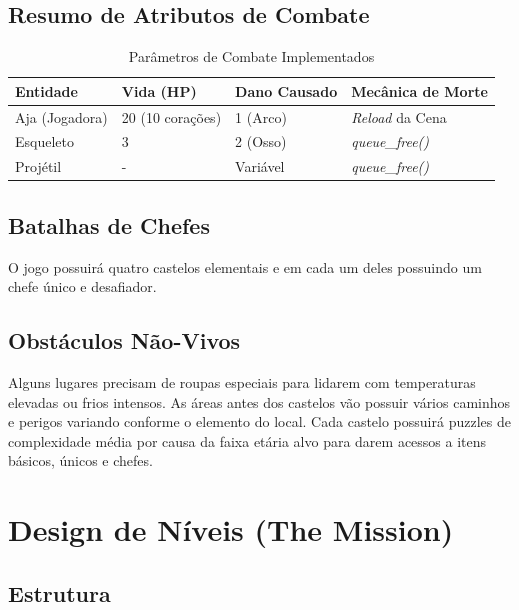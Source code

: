 \documentclass[12pt, a4paper]{article} %
\begin{document}
	\subsection{Resumo de Atributos de Combate}
	\begin{table}[H]
		\centering
		\caption{Parâmetros de Combate Implementados}
		\vspace{0.2cm}
		\begin{tabular}{@{}llll@{}}
			\toprule
			\textbf{Entidade} & \textbf{Vida (HP)} & \textbf{Dano Causado} & \textbf{Mecânica de Morte} \\ \midrule
			Aja (Jogadora)    & 20 (10 corações)   & 1 (Arco)       & \textit{Reload} da Cena    \\
			Esqueleto         & 3                  & 2 (Osso)              & \textit{queue\_free()}     \\
			Projétil          & -                  & Variável              & \textit{queue\_free()}     \\ \bottomrule
		\end{tabular}
	\end{table}
	
	\subsection{Batalhas de Chefes}
	
	O jogo possuirá quatro castelos elementais e em cada um deles possuindo um chefe único e desafiador.
	
	\subsection{Obstáculos Não-Vivos}
	
	Alguns lugares precisam de roupas especiais para lidarem com temperaturas elevadas ou frios intensos.
	As áreas antes dos castelos vão possuir vários caminhos e perigos variando conforme o elemento do local.
	Cada castelo possuirá puzzles de complexidade média por causa da faixa etária alvo para darem acessos a itens básicos, únicos e chefes.
	
	\newpage
	
	
	\section{Design de Níveis (The Mission)}
	
	\subsection{Estrutura}
	
\end{document}
